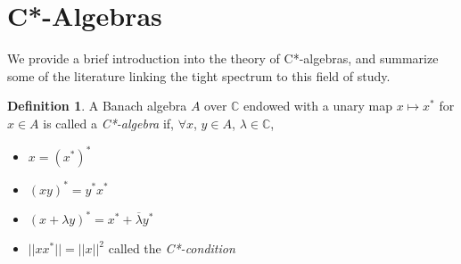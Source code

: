 \documentclass[12pt]{article}
\theoremstyle{definition}
\newtheorem{definition}[theorem]{Definition}
\begin{document}
\section{C*-Algebras}
We provide a brief introduction into the theory of C*-algebras, and summarize
some of the literature linking the tight spectrum to this field of study. 

\begin{definition}
    A Banach algebra $A$ over $\mathbb{C}$ endowed with a unary map $x \mapsto x^*$ for $x \in A$
    is called a \emph{C*-algebra} if, $\forall x$, $y \in A$, $\lambda \in \mathbb{C}$,
    \begin{itemize}
        \item $x = (x^*)^*$
        \item $(xy)^* = y^*x^*$
        \item $(x + \lambda y)^* = x^* + \overline{\lambda} y^*$
        \item $||xx^*|| = ||x||^2$ \quad called the \emph{C*-condition}
    \end{itemize}
\end{definition}

\printbibliography
\end{document}
